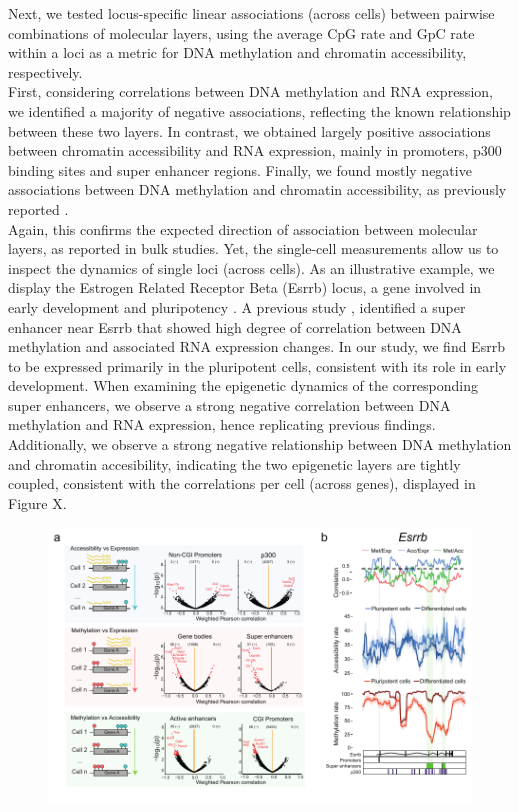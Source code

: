 Next, we tested locus-specific linear associations (across cells) between pairwise combinations of molecular layers, using the average CpG rate and GpC rate within a loci as a metric for DNA methylation and chromatin accessibility, respectively.\\
First, considering correlations between DNA methylation and RNA expression, we identified a majority of negative associations, reflecting the known relationship between these two layers. In contrast, we obtained largely positive associations between chromatin accessibility and RNA expression, mainly in promoters, p300 binding sites and super enhancer regions. Finally, we found mostly negative associations between DNA methylation and chromatin accessibility, as previously reported \cite{XX}.\\
Again, this confirms the expected direction of association between molecular layers, as reported in bulk studies. Yet, the single-cell measurements allow us to inspect the dynamics of single loci (across cells). As an illustrative example, we display the Estrogen Related Receptor Beta (Esrrb) locus, a gene involved in early development and pluripotency \cite{Papp2012}. A previous study \cite{Angermueller2016}, identified a super enhancer near Esrrb that showed high degree of correlation between DNA methylation and associated RNA expression changes. In our study, we find Esrrb to be expressed primarily in the pluripotent cells, consistent with its role in early development. When examining the epigenetic dynamics of the corresponding super enhancers, we observe a strong negative correlation between DNA methylation and RNA expression, hence replicating previous findings. Additionally, we observe a strong negative relationship between DNA methylation and chromatin accesibility, indicating the two epigenetic layers are tightly coupled, consistent with the correlations per cell (across genes), displayed in Figure X.

\begin{figure}[H]
	\centering
	\includegraphics[width=0.9\linewidth]{scNMT_EB_correlations}
	\caption[]{}
	\label{fig:scnmt_eb_correlations}
\end{figure}


